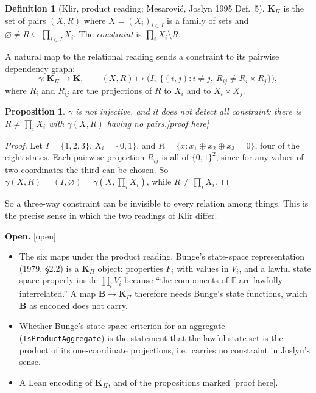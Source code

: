 \documentclass[11pt]{article}
\newtheorem{proposition}[theorem]{Proposition}
\theoremstyle{definition}
\newtheorem{definition}[theorem]{Definition}
\theoremstyle{remark}
\newcommand{\K}{\mathbf{K}}
\newcommand{\KP}{\mathbf{K}_{\Pi}}
\newcommand{\B}{\mathbf{B}}
\newcommand{\lean}[1]{\texttt{#1}}
\newcommand{\status}[1]{\hfill\textsf{\small[#1]}}
\begin{document}
\begin{definition}[Klir, product reading; Mesarovi\'c, Joslyn 1995 Def.~5]
$\KP$ is the set of pairs $(X,R)$ where $X=(X_i)_{i\in I}$ is a family of sets and $\varnothing\neq R\subseteq\prod_{i\in I}X_i$. The \emph{constraint} is $\prod_i X_i\setminus R$.
\end{definition}

A natural map to the relational reading sends a constraint to its pairwise dependency graph:
\[
\gamma:\KP\to\K,\qquad (X,R)\mapsto\bigl(I,\ \{(i,j): i\neq j,\ R_{ij}\neq R_i\times R_j\}\bigr),
\]
where $R_i$ and $R_{ij}$ are the projections of $R$ to $X_i$ and to $X_i\times X_j$.

\begin{proposition}\label{prop:xor}
$\gamma$ is not injective, and it does not detect all constraint: there is $R\neq\prod_i X_i$ with $\gamma(X,R)$ having no pairs.\status{proof here}
\end{proposition}
\begin{proof}
Let $I=\{1,2,3\}$, $X_i=\{0,1\}$, and $R=\{x: x_1\oplus x_2\oplus x_3=0\}$, four of the eight states. Each pairwise projection $R_{ij}$ is all of $\{0,1\}^2$, since for any values of two coordinates the third can be chosen. So $\gamma(X,R)=(I,\varnothing)=\gamma(X,\prod_iX_i)$, while $R\neq\prod_iX_i$.
\end{proof}

So a three-way constraint can be invisible to every relation among things. This is the precise sense in which the two readings of Klir differ.

\textbf{Open.} \textsf{[open]}
\begin{itemize}[nosep]
\item The six maps under the product reading. Bunge's state-space representation (1979, \S2.2) is a $\KP$ object: properties $F_i$ with values in $V_i$, and a lawful state space properly inside $\prod_iV_i$ because ``the components of $\mathbb F$ are lawfully interrelated.'' A map $\B\to\KP$ therefore needs Bunge's state functions, which $\B$ as encoded does not carry.
\item Whether Bunge's state-space criterion for an aggregate (\lean{IsProductAggregate}) is the statement that the lawful state set is the product of its one-coordinate projections, i.e.\ carries no constraint in Joslyn's sense.
\item A Lean encoding of $\KP$, and of the propositions marked \textsf{[proof here]}.
\end{itemize}
\end{document}
